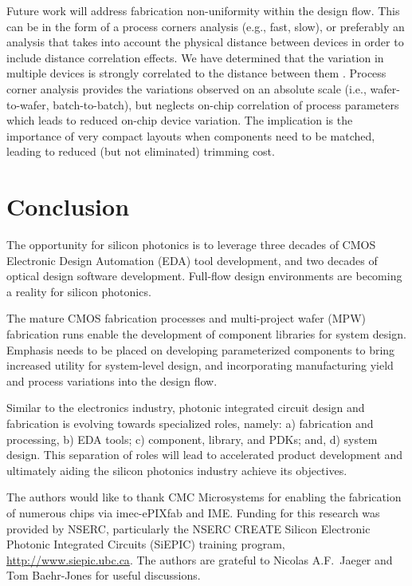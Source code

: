 \documentclass[journal]{spie}
\begin{document}
Future work will address fabrication non-uniformity within the design flow.  This can be in the form of a process corners analysis (e.g., fast, slow), or preferably an analysis that takes into account the physical distance between devices in order to include distance correlation effects.  We have determined that the variation in multiple devices is strongly correlated to the distance between them \cite{chrostowski2014impact}.  Process corner analysis provides the variations observed on an absolute scale (i.e., wafer-to-wafer, batch-to-batch), but neglects on-chip correlation of process parameters which leads to reduced on-chip device variation.  The implication is the importance of very compact layouts when components need to be matched, leading to reduced (but not eliminated) trimming cost.  



\section{Conclusion}\label{sec6}

The opportunity for silicon photonics is to leverage three decades of CMOS Electronic Design Automation (EDA) tool development, and two decades of optical design software development.
Full-flow design environments are becoming a reality for silicon photonics.

The mature CMOS fabrication processes and multi-project wafer (MPW) fabrication runs 
enable the development of component libraries for system design.  Emphasis needs to be placed on developing parameterized components to bring increased utility for system-level design, and incorporating manufacturing yield and process variations into the design flow.  

Similar to the electronics industry, photonic integrated circuit design and fabrication is evolving towards specialized roles, namely: a) fabrication and processing, b) EDA tools; c) component, library, and PDKs; and, d) system design.  This separation of roles will lead to accelerated product development and ultimately aiding the silicon photonics industry achieve its objectives. 



\acknowledgments

The authors would like to thank CMC Microsystems for enabling the fabrication of numerous chips via imec-ePIXfab and IME. 
Funding for this research was provided by NSERC, particularly the NSERC CREATE Silicon Electronic Photonic Integrated Circuits (SiEPIC) training program, \url{http://www.siepic.ubc.ca}.
The authors are grateful to Nicolas A.F.~Jaeger and Tom Baehr-Jones for useful discussions. 



\end{document}
